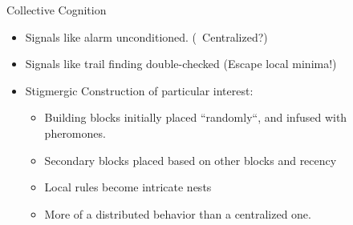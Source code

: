 \documentclass{beamer}
\begin{document}
  \begin{frame}{Collective Cognition}
      \begin{itemize}
          \item Signals like alarm unconditioned. \tiny (~Centralized?) \normalsize
          \item Signals like trail finding double-checked \tiny (Escape local minima!) \normalsize
          \item Stigmergic Construction of particular interest:
              \begin{itemize}
                  \item Building blocks initially placed ``randomly``, and infused with pheromones.
                  \item Secondary blocks placed based on other blocks and recency
                  \item Local rules become intricate nests
                  \item More of a distributed behavior than a centralized one.
              \end{itemize}
      \end{itemize}
  \end{frame}
\end{document}
